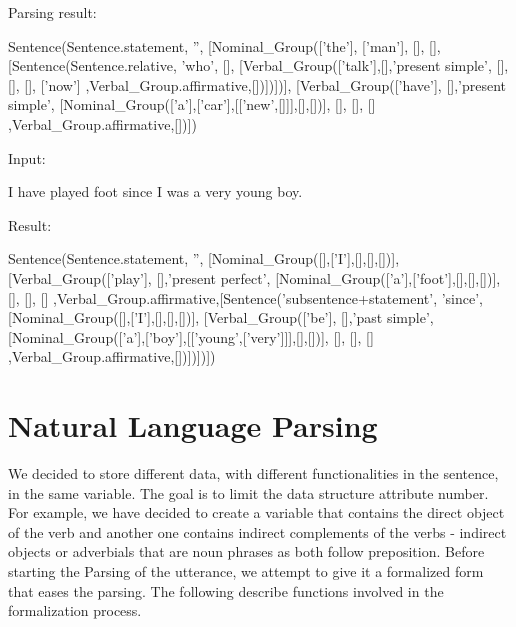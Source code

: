 \documentclass[twoside,a4paper,10pt]{report}
\begin{document}
Parsing result:


\small
\begin{verbatimtab}
  Sentence(Sentence.statement, '', 
      [Nominal_Group(['the'], ['man'], [], [],[Sentence(Sentence.relative, 'who', 
          [],  
          [Verbal_Group(['talk'],[],'present simple', 
              [], 
              [],
              [], ['now'] ,Verbal_Group.affirmative,[])])])],  
      [Verbal_Group(['have'], [],'present simple', 
          [Nominal_Group(['a'],['car'],[['new',[]]],[],[])],
          [],
          [], [] ,Verbal_Group.affirmative,[])])
\end{verbatimtab}
\normalsize

Input:


\small
\begin{verbatimtab}
I have played foot since I was a very young boy.
\end{verbatimtab}
\normalsize
Result:


\small
\begin{verbatimtab}
  Sentence(Sentence.statement, '', 
      [Nominal_Group([],['I'],[],[],[])], 
      [Verbal_Group(['play'], [],'present perfect', 
          [Nominal_Group(['a'],['foot'],[],[],[])], 
          [],
          [], [] ,Verbal_Group.affirmative,[Sentence('subsentence+statement', 'since', 
              [Nominal_Group([],['I'],[],[],[])], 
              [Verbal_Group(['be'], [],'past simple', 
                  [Nominal_Group(['a'],['boy'],[['young',['very']]],[],[])], 
                  [],
                  [], [] ,Verbal_Group.affirmative,[])])])])
\end{verbatimtab}
\normalsize

\chapter{Natural Language Parsing}
\label{40b6d909561b858c733e07e5b7595576}%
We decided to store different data, with different functionalities in the sentence, in the same variable. The goal is to limit the data structure attribute number.
For example, we have decided to create a variable that contains the direct object of the verb and another one contains indirect complements of the verbs - indirect objects or adverbials that are noun phrases as both follow preposition.
Before starting the Parsing of the utterance, we attempt to give it a formalized form that eases the parsing. The following describe functions involved in the formalization process.
\end{document}
